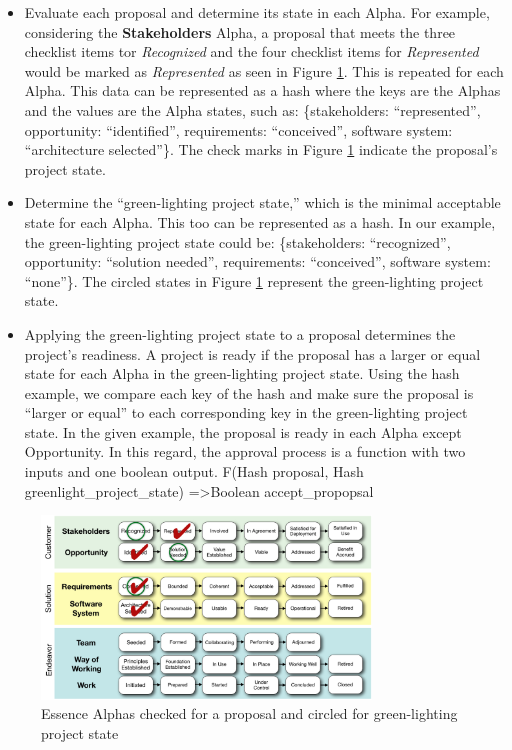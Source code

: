 \documentclass[conference]{IEEEtran}
\begin{document}
\begin{itemize}
\itemsep1pt\parskip0pt
\item
  Evaluate each proposal and determine its state in each Alpha. For
  example, considering the  \textbf{Stakeholders} Alpha, a proposal that meets the three checklist items tor \textit{Recognized}
  and the four checklist items for \textit{Represented} would be marked as \textit{Represented} as seen in Figure
  \ref{EssenceAlpha}. This is repeated for each Alpha.
  This data can be represented as a hash where the keys are the Alphas
  and the values are the Alpha states, such as: \{stakeholders:
  ``represented'', opportunity: ``identified'', requirements:
  ``conceived'', software system: ``architecture selected''\}. The check marks in Figure
  \ref{EssenceAlpha} indicate the proposal's project
  state.
\item
  Determine the ``green-lighting project state,'' which is the minimal
  acceptable state for each Alpha. This too can be represented as a
  hash. In our example, the green-lighting project state could be:
  \{stakeholders: ``recognized'', opportunity: ``solution needed'',
  requirements: ``conceived'', software system: ``none''\}. The circled
  states in Figure \ref{EssenceAlpha} represent the
  green-lighting project state.
\item
  Applying the green-lighting project state to a proposal determines
  the project's readiness. A project is ready if the proposal has a
  larger or equal state for each Alpha in the green-lighting project
  state. Using the hash example, we compare each key of the hash and
  make sure the proposal is ``larger or equal'' to each corresponding
  key in the green-lighting project state. In the given example, the
  proposal is ready in each Alpha except Opportunity. In this regard, the approval process
  is a function with two inputs and one boolean output. F(Hash proposal,
  Hash greenlight\_project\_state) =\textgreater Boolean
  accept\_propopsal
\end{itemize}



\begin{figure}[!t]
\centering
\includegraphics[width=3.45in]{EssenceAlpha.png}
\caption{Essence Alphas checked for a proposal and circled for
green-lighting project state}
\label{EssenceAlpha}
\end{figure}
\end{document}
